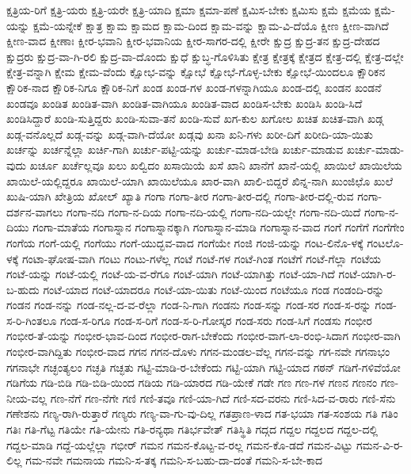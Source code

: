 ಕ್ಷತ್ರಿಯ-ರಿಗೆ
ಕ್ಷತ್ರಿ-ಯರು
ಕ್ಷತ್ರಿ-ಯರೇ
ಕ್ಷತ್ರಿ-ಯಾದಿ
ಕ್ಷಮಾ
ಕ್ಷಮಾ-ಪಣೆ
ಕ್ಷಮಿಸ-ಬೇಕು
ಕ್ಷಮಿಸು
ಕ್ಷಮೆ
ಕ್ಷಮೆಯ
ಕ್ಷಮೆ-ಯನ್ನು
ಕ್ಷಮೆ-ಯನ್ನೇಕೆ
ಕ್ಷಾತ್ರ
ಕ್ಷಾಮ
ಕ್ಷಾಮದ
ಕ್ಷಾಮ-ದಿಂದ
ಕ್ಷಾಮ-ವನ್ನು
ಕ್ಷಾಮ-ವಿ-ದೆಯೊ
ಕ್ಷೀಣ
ಕ್ಷೀಣ-ವಾಗಿದೆ
ಕ್ಷೀಣ-ವಾದ
ಕ್ಷೀಣಾಃ
ಕ್ಷೀರ-ಭವಾನಿ
ಕ್ಷೀರ-ಭವಾನಿಯ
ಕ್ಷೀರ-ಸಾಗರ-ದಲ್ಲಿ
ಕ್ಷೀರೇ
ಕ್ಷುದ್ರ
ಕ್ಷುದ್ರ-ತನ
ಕ್ಷುದ್ರ-ದೇಹದ
ಕ್ಷುದ್ರರು
ಕ್ಷುದ್ರ-ವಾ-ಗಿ-ರಲಿ
ಕ್ಷುದ್ರ-ವಾ-ದೊಂದು
ಕ್ಷುಧೆ
ಕ್ಷುಬ್ಧ-ಗೊಳಿಸಿತು
ಕ್ಷೇತ್ರ
ಕ್ಷೇತ್ರಕ್ಕೆ
ಕ್ಷೇತ್ರದ
ಕ್ಷೇತ್ರ-ದಲ್ಲಿ
ಕ್ಷೇತ್ರ-ದಲ್ಲೇ
ಕ್ಷೇತ್ರ-ವನ್ನಾಗಿ
ಕ್ಷೇಮ
ಕ್ಷೇಮ-ವೆಂದು
ಕ್ಷೋಭ-ವನ್ನು
ಕ್ಷೋಭೆ
ಕ್ಷೋಭೆ-ಗೊಳ್ಳ-ಬೇಕು
ಕ್ಷೋಭೆ-ಯಿಂದಲೂ
ಕ್ಷೌರಿಕನ
ಕ್ಷೌರಿಕ-ನಾದ
ಕ್ಷೌರಿಕ-ನಿಗೂ
ಕ್ಷೌರಿಕ-ನಿಗೆ
ಖಂಡ
ಖಂಡ-ಗಳ
ಖಂಡ-ಗಳನ್ನಾಗಿಯೂ
ಖಂಡ-ದಲ್ಲಿ
ಖಂಡನ
ಖಂಡನೆ
ಖಂಡವೂ
ಖಂಡಿತ
ಖಂಡಿತ-ವಾಗಿ
ಖಂಡಿತ-ವಾಗಿಯೂ
ಖಂಡಿತ-ವಾದ
ಖಂಡಿಸ-ಬೇಕು
ಖಂಡಿಸಿ
ಖಂಡಿ-ಸಿದೆ
ಖಂಡಿಸಿದ್ದಾರೆ
ಖಂಡಿ-ಸುತ್ತಿದ್ದರು
ಖಂಡಿ-ಸುವಾ-ತನೆ
ಖಂಡಿ-ಸುವೆ
ಖಗ-ಕುಲ
ಖಗೋಲ
ಖಚಿತ
ಖಚಿತ-ವಾಗಿ
ಖಡ್ಗ
ಖಡ್ಗ-ವನೊಲ್ಲದೆ
ಖಡ್ಗ-ವನ್ನು
ಖಡ್ಗ-ವಾಗಿ-ದೆಯೋ
ಖಡ್ಗವು
ಖನಾ
ಖನಿ-ಗಳು
ಖರೀ-ದಿಗೆ
ಖರೀದಿ-ಯಾ-ಯಿತು
ಖರ್ಚನ್ನು
ಖರ್ಚನ್ನೆಲ್ಲಾ
ಖರ್ಚಿ-ಗಾಗಿ
ಖರ್ಚು-ಪಟ್ಟಿ-ಯನ್ನು
ಖರ್ಚು-ಮಾಡ-ಬೇಡಿ
ಖರ್ಚು-ಮಾಡುವ
ಖರ್ಚು-ಮಾಡು-ವುದು
ಖರ್ಚೂ
ಖರ್ಚೆಲ್ಲವೂ
ಖಲು
ಖಲ್ವಿದಂ
ಖಸಾಯಿಯೆ
ಖಸೆ
ಖಾನಿ
ಖಾನೆಗೆ
ಖಾನೆ-ಯಲ್ಲಿ
ಖಾಯಿಲೆ
ಖಾಯಿಲೆಯ
ಖಾಯಿಲೆ-ಯಲ್ಲಿದ್ದರೂ
ಖಾಯಿಲೆ-ಯಾಗಿ
ಖಾಯಿಲೆಯೂ
ಖಾರ-ವಾಗಿ
ಖಾಲಿ-ಬಿದ್ದರೆ
ಖಿನ್ನ-ನಾಗಿ
ಖುಂಜಿಛೊ
ಖುಲೆ
ಖುಷಿ-ಯಾಗಿ
ಖೇತ್ರಿಯ
ಖೋಲ್
ಖ್ಯಾತಿ
ಗಂಗಾ
ಗಂಗಾ-ತೀರ
ಗಂಗಾ-ತೀರ-ದಲ್ಲಿ
ಗಂಗಾ-ತೀರ-ದಲ್ಲಿ-ರುವ
ಗಂಗಾ-ದರ್ಶನ-ವಾಗಲು
ಗಂಗಾ-ನದಿ
ಗಂಗಾ-ನ-ದಿಯ
ಗಂಗಾ-ನದಿ-ಯಲ್ಲಿ
ಗಂಗಾ-ನದಿ-ಯಲ್ಲೇ
ಗಂಗಾ-ನದಿ-ಯಿದೆ
ಗಂಗಾ-ನ-ದಿಯು
ಗಂಗಾ-ಮಾತೆಯ
ಗಂಗಾಸ್ನಾನ
ಗಂಗಾಸ್ನಾನಕ್ಕಾಗಿ
ಗಂಗಾಸ್ನಾನ-ಮಾಡಿ
ಗಂಗಾಸ್ನಾನ-ವಾದ
ಗಂಗೆ
ಗಂಗೆಗೆ
ಗಂಗೆಗೇಂ
ಗಂಗೆಯ
ಗಂಗೆ-ಯಲ್ಲಿ
ಗಂಗೆಯು
ಗಂಗೆ-ಯುದ್ಭವ-ವಾದ
ಗಂಗೆಯೇ
ಗಂಜಿ
ಗಂಜಿ-ಯನ್ನು
ಗಂಟ-ಲಿನೊ-ಳಕ್ಕೆ
ಗಂಟಲೊ-ಳಕ್ಕೆ
ಗಂಟಾ-ಘೋಷ-ವಾಗಿ
ಗಂಟು
ಗಂಟು-ಗಳೆಲ್ಲ
ಗಂಟೆ
ಗಂಟೆ-ಗಳ
ಗಂಟೆ-ಗಿಂತ
ಗಂಟೆಗೆ
ಗಂಟೆ-ಗೆಲ್ಲಾ
ಗಂಟೆಯ
ಗಂಟೆ-ಯನ್ನು
ಗಂಟೆ-ಯಲ್ಲಿ
ಗಂಟೆ-ಯ-ವ-ರೆಗೂ
ಗಂಟೆ-ಯಾಗಿ
ಗಂಟೆ-ಯಾಗಿತ್ತು
ಗಂಟೆ-ಯಾ-ಗಿದೆ
ಗಂಟೆ-ಯಾಗಿ-ರ-ಬ-ಹುದು
ಗಂಟೆ-ಯಾದ
ಗಂಟೆ-ಯಾದರೂ
ಗಂಟೆ-ಯಾ-ಯಿತು
ಗಂಟೆ-ಯಿಂದ
ಗಂಟೆಯೂ
ಗಂಡ
ಗಂಡಂದಿ-ರನ್ನು
ಗಂಡನ
ಗಂಡ-ನನ್ನು
ಗಂಡ-ನಲ್ಲ-ದ-ವ-ರೆಲ್ಲಾ
ಗಂಡ-ನಿ-ಗಾಗಿ
ಗಂಡನು
ಗಂಡ-ಸನ್ನು
ಗಂಡ-ಸರ
ಗಂಡ-ಸ-ರನ್ನು
ಗಂಡ-ಸ-ರಿ-ಗಿಂತಲೂ
ಗಂಡ-ಸ-ರಿಗೂ
ಗಂಡ-ಸ-ರಿಗೆ
ಗಂಡ-ಸ-ರಿ-ಗೋಸ್ಕರ
ಗಂಡ-ಸರು
ಗಂಡ-ಸಿಗೆ
ಗಂಡಸು
ಗಂಭೀರ
ಗಂಭೀರ-ತೆ-ಯನ್ನು
ಗಂಭೀರ-ಭಾವ-ದಿಂದ
ಗಂಭೀರ-ರಾಗ-ಬೇಕೆಂದು
ಗಂಭೀರ-ವಾಗ-ಲಾ-ರಂಭಿ-ಸಿದಾಗ
ಗಂಭೀರ-ವಾಗಿ
ಗಂಭೀರ-ವಾಗಿದ್ದಿತು
ಗಂಭೀರ-ವಾದ
ಗಗನ
ಗಗನ-ದೊಳು
ಗಗನ-ಮಂಡಲ-ವೆಲ್ಲ
ಗಗನ-ವನ್ನು
ಗಗ-ನವೇ
ಗಗನಾಭಂ
ಗಗನಾಭೇ
ಗಚ್ಛಂತ್ಯಲಂ
ಗಚ್ಛತಿ
ಗಚ್ಛತು
ಗಟ್ಟಿ-ಮಾಡಿ-ರ-ಬೇಕೆಂದು
ಗಟ್ಟಿ-ಯಾಗಿ
ಗಟ್ಟಿ-ಯಾದ
ಗಠನ್
ಗಡಿಗೆ-ಗಳಿವೆಯೋ
ಗಡಿಗೆಯ
ಗಡಿ-ಬಿಡಿ
ಗಡಿ-ಬಿಡಿ-ಯಿಂದ
ಗಡಿಯ
ಗಡಿ-ಯಾರದ
ಗಡಿ-ಯೇಕೆ
ಗಡೇ
ಗಣ
ಗಣ-ಗಳ
ಗಣನ
ಗಣನಂ
ಗಣ-ನೀಯ-ವಲ್ಲ
ಗಣ-ನೆಗೆ
ಗಣ-ನೆಗೇ
ಗಣಿ
ಗಣಿ-ತವೂ
ಗಣಿ-ಯಾ-ಗಿದೆ
ಗಣಿ-ಸದ-ವರನು
ಗಣಿ-ಸಿದ-ವ-ರಾರು
ಗಣಿ-ಸೆನು
ಗಣೇಶನು
ಗಣ್ಯ-ರಾಗಿ-ರುತ್ತಾರೆ
ಗಣ್ಯರು
ಗಣ್ಯ-ವಾ-ಗು-ವು-ದಿಲ್ಲ
ಗತಪ್ರಾಣ-ಳಾದ
ಗತ-ಭಯಾ
ಗತ-ಸಂಶಯ
ಗತಿ
ಗತಿಂ
ಗತಿಃ
ಗತಿ-ಗೆಟ್ಟ
ಗತಿಯೇ
ಗತಿ-ಯೇನು
ಗತಿ-ರನ್ಯಥಾ
ಗತಿರ್ಭವೇತ್
ಗತಿಸ್ಥಿತಿ
ಗದ್ಗದ
ಗದ್ದಲ
ಗದ್ದಲದ
ಗದ್ದಲ-ದಲ್ಲಿ
ಗದ್ದಲ-ಮಾಡಿ
ಗದ್ದೆ-ಯಲ್ಲೆಲ್ಲಾ
ಗಭೀರ್
ಗಮನ
ಗಮನ-ಕೊಟ್ಟ-ವ-ರಲ್ಲ
ಗಮನ-ಕೊ-ಡದೆ
ಗಮನ-ವಿಟ್ಟು
ಗಮನ-ವಿ-ರ-ಲಿಲ್ಲ
ಗಮ-ನವೇ
ಗಮನಾಯ
ಗಮನಿ-ಸ-ತಕ್ಕ
ಗಮನಿ-ಸ-ಬಹು-ದಾ-ದಂತೆ
ಗಮನಿ-ಸ-ಬೇ-ಕಾದ
